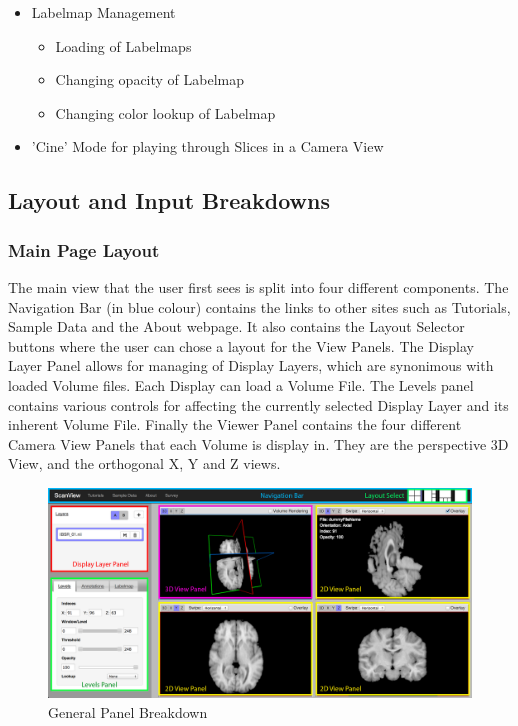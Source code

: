 \documentclass[a4paper,11pt,twoside]{article}
\begin{document}
\begin{itemize}
\item Labelmap Management

  \begin{itemize}
  \item Loading of Labelmaps
  \item Changing opacity of Labelmap
  \item Changing color lookup of Labelmap
  \end{itemize}

\item 'Cine' Mode for playing through Slices in a Camera View

\end{itemize}


\subsection{Layout and Input Breakdowns}

\subsubsection{Main Page Layout}

The main view that the user first sees is split into four different components. The Navigation Bar (in blue colour) contains the links to other sites such as Tutorials, Sample Data and the About webpage. It also contains the Layout Selector buttons where the user can chose a layout for the View Panels. The Display Layer Panel allows for managing of Display Layers, which are synonimous with loaded Volume files. Each Display can load a Volume File. The Levels panel contains various controls for affecting the currently selected Display Layer and its inherent Volume File. Finally the Viewer Panel contains the four different Camera View Panels that each Volume is display in. They are the perspective 3D View, and the orthogonal X, Y and Z views.

\begin{figure}[ht!]
\centering
\includegraphics[width=170mm]{graphics/features_01.png}
\caption{General Panel Breakdown}
\label{fig:UIdesign1}
\end{figure}
\end{document}
